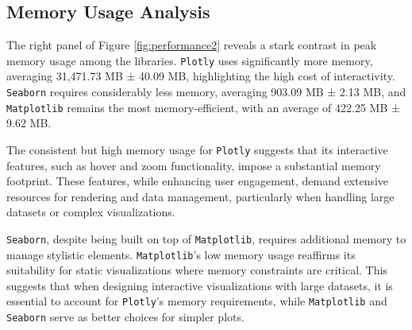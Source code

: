 \subsection{Memory Usage Analysis}

The right panel of Figure \ref{fig:performance2} reveals a stark contrast in peak memory usage among the libraries. \texttt{Plotly} uses significantly more memory, averaging 31,471.73 MB ± 40.09 MB, highlighting the high cost of interactivity. \texttt{Seaborn} requires considerably less memory, averaging 903.09 MB ± 2.13 MB, and \texttt{Matplotlib} remains the most memory-efficient, with an average of 422.25 MB ± 9.62 MB.

The consistent but high memory usage for \texttt{Plotly} suggests that its interactive features, such as hover and zoom functionality, impose a substantial memory footprint. These features, while enhancing user engagement, demand extensive resources for rendering and data management, particularly when handling large datasets or complex visualizations.

\texttt{Seaborn}, despite being built on top of \texttt{Matplotlib}, requires additional memory to manage stylistic elements. \texttt{Matplotlib}'s low memory usage reaffirms its suitability for static visualizations where memory constraints are critical. This suggests that when designing interactive visualizations with large datasets, it is essential to account for \texttt{Plotly}'s memory requirements, while \texttt{Matplotlib} and \texttt{Seaborn} serve as better choices for simpler plots.